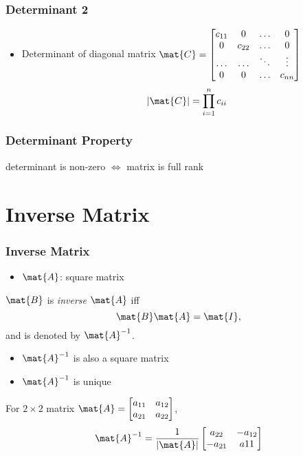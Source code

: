 \documentclass[mathserif, xcolor=table, svgnames]{beamer}
\begin{document}
\begin{frame}
  \frametitle{Determinant 2}
  \begin{itemize}
  \item Determinant of diagonal matrix
    \begin{math}
      \mat{C} = 
      \begin{bmatrix}
        c_{11} & 0     & \hdots & 0\\
        0     & c_{22} & \hdots & 0\\
        \hdots&\hdots & \ddots & \vdots\\
        0     & 0     & \hdots & c_{nn}\\
      \end{bmatrix}
    \end{math}
    \begin{equation*}
      |\mat{C}|
      = \prod_{i=1}^{n} c_{ii}
    \end{equation*}
  \end{itemize}
\end{frame}

\begin{frame}
  \frametitle{Determinant Property}
  \begin{theorem}
    determinant is non-zero $\Leftrightarrow$ matrix is full rank
  \end{theorem}
\end{frame}

\section{Inverse Matrix}

\begin{frame}
  \frametitle{Inverse Matrix}
  \begin{itemize}
  \item $\mat{A}$: square matrix
  \end{itemize}
  $\mat{B}$ is \emph{inverse} $\mat{A}$ iff
  \begin{equation*}
    \mat{B} \mat{A} = \mat{I},
  \end{equation*}
  and is denoted by $\mat{A}^{-1}$.
  \begin{itemize}
  \item $\mat{A}^{-1}$ is also a square matrix
  \item $\mat{A}^{-1}$ is unique
  \end{itemize}
  For $2\times2$ matrix 
  \begin{math}
    \mat{A} = 
    \begin{bmatrix}
      a_{11} & a_{12}\\
      a_{21} & a_{22}\\
    \end{bmatrix}
  \end{math},
  \begin{equation*}
    \mat{A}^{-1} =
    \frac{1}{|\mat{A}|}
    \begin{bmatrix}
      a_{22} & -a_{12} \\
      -a_{21} & a11\\
    \end{bmatrix}
  \end{equation*}
\end{frame}
\end{document}

